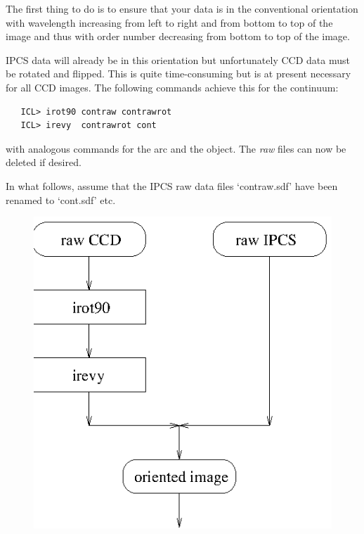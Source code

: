    The first thing to do is to ensure that your data is in the
   conventional orientation with wavelength increasing from left to
   right and from bottom to top of the image and thus with order number
   decreasing from bottom to top of the image.

   IPCS data will already be in this orientation but unfortunately CCD
   data must be rotated and flipped. This is quite time-consuming but is
   at present necessary for all CCD images. The following commands
   achieve this for the continuum:

\begin{verbatim}
   ICL> irot90 contraw contrawrot
   ICL> irevy  contrawrot cont
\end{verbatim}

   with analogous commands for the arc and the object. The {\em raw\/}
   files can now be deleted if desired.

   In what follows, assume that the IPCS raw data files `contraw.sdf' have
   been renamed to `cont.sdf' etc.

\begin{latexonly}
\begin{figure}[htb]
\begin{center}
\includegraphics{sun86_ech1.eps}
\end{center}
\end{figure}
\end{latexonly}

